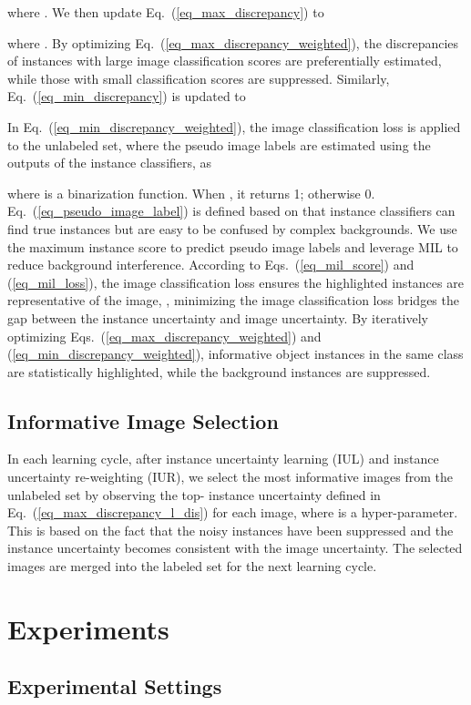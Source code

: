 \documentclass[final]{cvpr}
\begin{document}
where . We then update Eq.~(\ref{eq_max_discrepancy}) to

where .
By optimizing Eq.~(\ref{eq_max_discrepancy_weighted}), the discrepancies of instances with large image classification scores are preferentially estimated, while those with small classification scores are suppressed. 
Similarly, Eq.~(\ref{eq_min_discrepancy}) is updated to

In Eq.~(\ref{eq_min_discrepancy_weighted}), the image classification loss is applied to the unlabeled set, where the pseudo image labels are estimated using the outputs of the instance classifiers, as

where  is a binarization function. When , it returns 1; otherwise 0. 
Eq.~(\ref{eq_pseudo_image_label}) is defined based on that instance classifiers can find true instances but are easy to be confused by complex backgrounds. We use the maximum instance score to predict pseudo image labels and leverage MIL to reduce background interference.
According to Eqs.~(\ref{eq_mil_score}) and (\ref{eq_mil_loss}), the image classification loss ensures the highlighted instances are representative of the image, \ie, minimizing the image classification loss bridges the gap between the instance uncertainty and image uncertainty. By iteratively optimizing Eqs.~(\ref{eq_max_discrepancy_weighted}) and (\ref{eq_min_discrepancy_weighted}), informative object instances in the same class are statistically highlighted, while the background instances are suppressed. 

\subsection{Informative Image Selection}
\label{sec:topk}
In each learning cycle, after instance uncertainty learning (IUL) and instance uncertainty re-weighting (IUR), we select the most informative images from the unlabeled set by observing the top- instance uncertainty defined in Eq.~(\ref{eq_max_discrepancy_l_dis}) for each image, where  is a hyper-parameter. This is based on the fact that the noisy instances have been suppressed and the instance uncertainty becomes consistent with the image uncertainty. The selected images are merged into the labeled set for the next learning cycle.

\section{Experiments}
\subsection{Experimental Settings}
\end{document}
